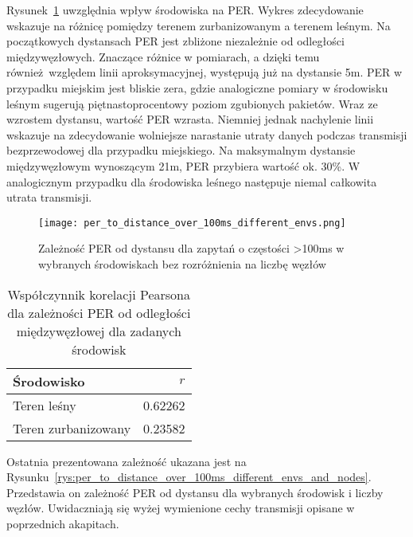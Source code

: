 Rysunek~\ref{rys:per_to_distance_over_100ms_different_envs} uwzględnia wpływ środowiska na PER. Wykres zdecydowanie
wskazuje na różnicę pomiędzy terenem zurbanizowanym a terenem leśnym. Na początkowych dystansach PER jest zbliżone
niezależnie od odległości międzywęzłowych. Znaczące różnice w pomiarach, a dzięki temu również względem linii aproksymacyjnej,
występują już na dystansie 5m. PER w przypadku miejskim jest bliskie zera, gdzie analogiczne pomiary w środowisku
leśnym sugerują piętnastoprocentowy poziom zgubionych pakietów. Wraz ze wzrostem dystansu, wartość PER wzrasta.
Niemniej jednak nachylenie linii wskazuje na zdecydowanie wolniejsze narastanie utraty danych podczas transmisji
bezprzewodowej dla przypadku miejskiego. Na maksymalnym dystansie międzywęzłowym wynoszącym 21m, PER
przybiera wartość ok. 30\%. W analogicznym przypadku dla środowiska leśnego następuje niemal całkowita utrata
transmisji.

\begin{figure}[!htb]
	\centering \texttt{[image: per\_to\_distance\_over\_100ms\_different\_envs.png]} 
	\caption{Zależność \gls{PER} od dystansu dla zapytań o częstości >100ms w wybranych środowiskach bez rozróżnienia na liczbę węzłów}
	\label{rys:per_to_distance_over_100ms_different_envs}
\end{figure}

\begin{table}[!ht]
\centering
	\begin{tabular}{p{4.5cm}|r}
	Środowisko              & $r$             \\\hline
	Teren leśny             & 0.62262         \\\hline
	Teren zurbanizowany     & 0.23582         \\\hline
	\end{tabular}
\caption{\label{tab:corr_between_per_and_env}Współczynnik korelacji Pearsona dla zależności PER od odległości międzywęzłowej dla zadanych środowisk}
\end{table}

Ostatnia prezentowana zależność ukazana jest na Rysunku~\ref{rys:per_to_distance_over_100ms_different_envs_and_nodes}.
Przedstawia on zależność PER od dystansu dla wybranych środowisk i liczby węzłów. Uwidaczniają się wyżej wymienione
cechy transmisji opisane w poprzednich akapitach.


